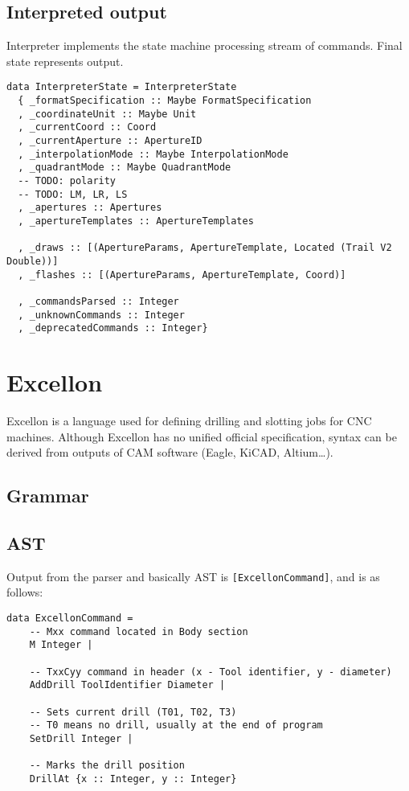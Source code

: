 \documentclass[12pt,a4paper]{article}
\begin{document}
\subsection{Interpreted output}
Interpreter implements the state machine processing stream of commands. Final state represents output.
\lstset{language=haskell}
\lstset{frame=lines}
\lstset{basicstyle=\footnotesize\ttfamily}
\begin{lstlisting}
data InterpreterState = InterpreterState
  { _formatSpecification :: Maybe FormatSpecification
  , _coordinateUnit :: Maybe Unit
  , _currentCoord :: Coord
  , _currentAperture :: ApertureID
  , _interpolationMode :: Maybe InterpolationMode
  , _quadrantMode :: Maybe QuadrantMode
  -- TODO: polarity
  -- TODO: LM, LR, LS
  , _apertures :: Apertures
  , _apertureTemplates :: ApertureTemplates

  , _draws :: [(ApertureParams, ApertureTemplate, Located (Trail V2 Double))]
  , _flashes :: [(ApertureParams, ApertureTemplate, Coord)]

  , _commandsParsed :: Integer
  , _unknownCommands :: Integer
  , _deprecatedCommands :: Integer}

\end{lstlisting}

\section{Excellon}
Excellon is a language used for defining drilling and slotting jobs for CNC machines. Although Excellon has no unified official specification, syntax can be derived from outputs of CAM software (Eagle, KiCAD, Altium\dots).

\subsection{Grammar}
\lstset{basicstyle=\scriptsize\ttfamily}

\subsection{AST}
Output from the parser and basically AST is \texttt{[ExcellonCommand]}, and is as follows:

\lstset{language=haskell}
\lstset{frame=lines}
\lstset{basicstyle=\footnotesize\ttfamily}
\begin{lstlisting}
data ExcellonCommand =
    -- Mxx command located in Body section
    M Integer |

    -- TxxCyy command in header (x - Tool identifier, y - diameter)
    AddDrill ToolIdentifier Diameter |

    -- Sets current drill (T01, T02, T3)
    -- T0 means no drill, usually at the end of program
    SetDrill Integer |

    -- Marks the drill position
    DrillAt {x :: Integer, y :: Integer}
\end{lstlisting}
\end{document}
